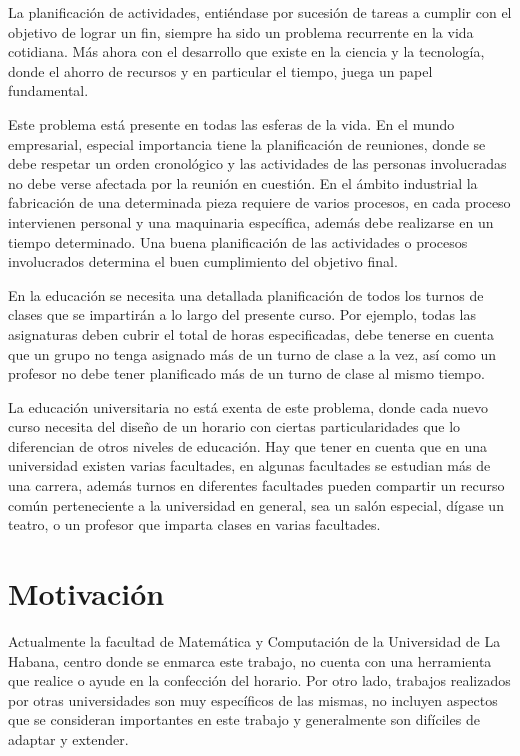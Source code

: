 \begin{introduction}

La planificación de actividades, entiéndase por sucesión de tareas a cumplir
con el objetivo de lograr un fin, siempre ha sido un problema recurrente en la
vida cotidiana. Más ahora con el desarrollo que existe en la ciencia y la tecnología,
donde el ahorro de recursos y en particular el tiempo, juega un papel fundamental.

Este problema está presente en todas las esferas de la vida. En el mundo empresarial,
especial importancia tiene la planificación de reuniones, donde se debe respetar un
orden cronológico y las actividades de las personas involucradas no debe verse afectada
por la reunión en cuestión. En el ámbito industrial la fabricación de una determinada
pieza requiere de varios procesos, en cada proceso intervienen personal y una maquinaria
específica, además debe realizarse en un tiempo determinado. Una buena planificación
de las actividades o procesos involucrados determina el buen cumplimiento del objetivo
final.

En la educación se necesita una detallada planificación de todos los turnos de clases que se
impartirán a lo largo del presente curso. Por ejemplo, todas las asignaturas deben cubrir el total de horas
especificadas, debe tenerse en cuenta que un grupo no tenga asignado más de un turno de clase
a la vez, as\'i como un profesor no debe tener planificado más de un turno de clase al mismo tiempo.

La educación universitaria no está exenta de este problema, donde cada nuevo curso necesita del
diseño de un horario con ciertas particularidades que lo diferencian de otros niveles de educación.
Hay que tener en cuenta que en una universidad existen varias facultades, en algunas facultades se
estudian más de una carrera, además turnos en diferentes facultades pueden compartir un recurso común
perteneciente a la universidad en general, sea un salón especial, d\'igase un teatro, o un profesor
que imparta clases en varias facultades.

\section*{Motivación}

Actualmente la facultad de Matemática y Computación de la Universidad de La Habana, centro donde 
se enmarca este trabajo, no cuenta con una herramienta que realice o ayude en la confección del horario.
Por otro lado, trabajos realizados por otras universidades son muy espec\'ificos de las mismas, no incluyen aspectos que se consideran importantes en este trabajo y generalmente son dif\'iciles de adaptar y extender.


\end{introduction}
